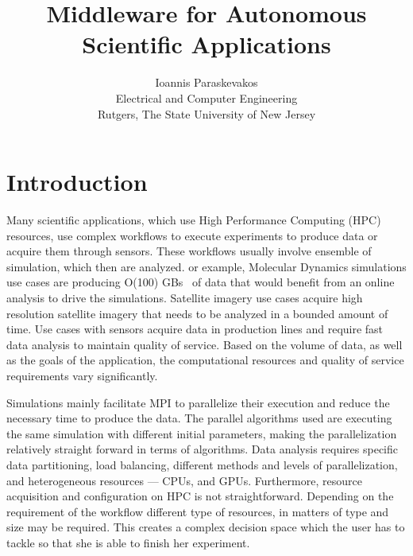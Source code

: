 

\title{Middleware for Autonomous Scientific Applications}
\author{Ioannis Paraskevakos \\	Electrical and Computer Engineering \\Rutgers, The State University of New Jersey}


\maketitle

\abstract{}


\section{Introduction}
Many scientific applications, which use High Performance Computing (HPC) 
resources, use complex workflows to execute experiments to produce data or 
acquire them through sensors. These workflows usually involve ensemble of 
simulation, which then are analyzed. or example, Molecular Dynamics simulations 
use cases are producing O(100) GBs~\cite{cheatham2015impact} of data that would 
benefit from an online analysis to drive the simulations. Satellite imagery use 
cases acquire high resolution satellite imagery that needs to be analyzed in a 
bounded amount of time. Use cases with sensors acquire data in production lines 
and require fast data analysis to maintain quality of service. Based on the 
volume of data, as well as the goals of the application, the computational 
resources and quality of service requirements vary significantly. 


Simulations mainly facilitate MPI to parallelize their execution and reduce the 
necessary time to produce the data. The parallel algorithms used are executing 
the same simulation with different initial parameters, making the 
parallelization relatively straight forward in terms of algorithms. Data 
analysis requires specific data partitioning, load balancing, different methods 
and levels of parallelization, and heterogeneous resources --- CPUs, and GPUs. 
Furthermore, resource acquisition and configuration on HPC is not 
straightforward. Depending on the requirement of the workflow different type of 
resources, in matters of type and size may be required. This creates a complex 
decision space which the user has to tackle so that she is able to finish her 
experiment.

